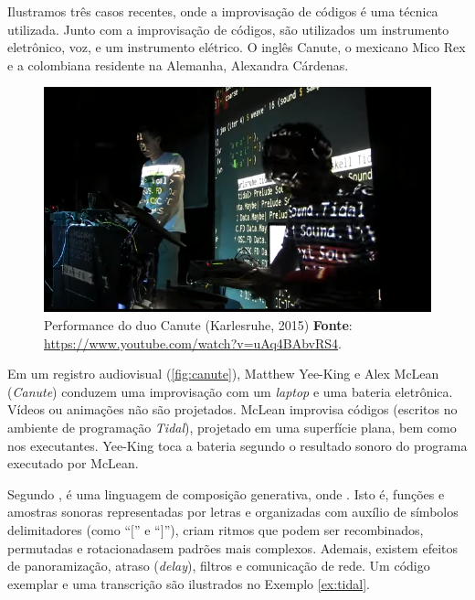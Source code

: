 Ilustramos três casos recentes, onde a improvisação de códigos é uma técnica utilizada. Junto com a improvisação de códigos, são utilizados um instrumento eletrônico, voz, e um instrumento elétrico. O inglês Canute, o mexicano Mico Rex e a colombiana residente na Alemanha, Alexandra Cárdenas.

\begin{figure}[!h]
  \centering
  \includegraphics[scale=0.71]{imagens/canute.png}
  \caption{Performance do duo Canute (Karlesruhe, 2015) \textbf{Fonte}: \url{https://www.youtube.com/watch?v=uAq4BAbvRS4}.}
  \label{fig:canute}
\end{figure}

Em um registro audiovisual (\autoref{fig:canute}), Matthew Yee-King e Alex McLean (\emph{Canute}) conduzem uma improvisação com um \emph{laptop} e uma bateria eletrônica. Vídeos ou animações não são projetados. McLean improvisa códigos (escritos no ambiente de programação \emph{Tidal}), projetado em uma superfície plana, bem como nos executantes. Yee-King toca a bateria segundo o resultado sonoro do programa executado por McLean.  

Segundo , é uma linguagem de composição generativa, onde . Isto é, funções e amostras sonoras representadas por letras e organizadas com auxílio de símbolos delimitadores (como ``$[$'' e ``$]$''), criam ritmos que podem ser recombinados, permutadas e rotacionadasem padrões mais complexos.  Ademais, existem efeitos de panoramização, atraso (\emph{delay}), filtros e comunicação de rede.
Um código exemplar e uma transcrição são ilustrados no Exemplo \autoref{ex:tidal}.

